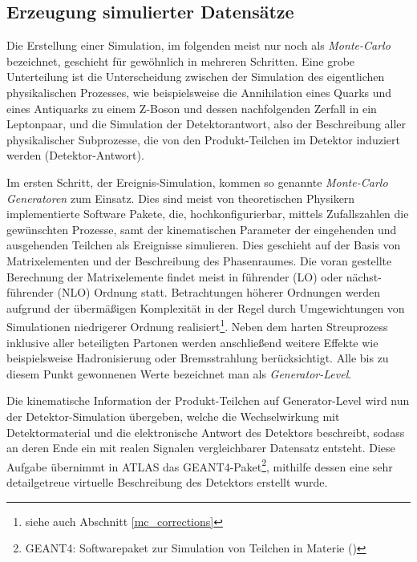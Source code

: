 \subsection{Erzeugung simulierter Datensätze}
\label{event_generation}
Die Erstellung einer Simulation, im folgenden meist nur noch als
\textit{Monte-Carlo} bezeichnet, geschieht für gewöhnlich in mehreren
Schritten. Eine grobe Unterteilung ist die Unterscheidung zwischen der
Simulation des eigentlichen physikalischen Prozesses, wie beispielsweise die
Annihilation eines Quarks und eines Antiquarks zu einem Z-Boson und dessen
nachfolgenden Zerfall in ein Leptonpaar, und die Simulation der
Detektorantwort, also der Beschreibung aller physikalischer Subprozesse, die
von den Produkt-Teilchen im Detektor induziert werden (Detektor-Antwort).

Im ersten Schritt, der Ereignis-Simulation, kommen so genannte
\textit{Monte-Carlo Generatoren} zum Einsatz. Dies sind meist von theoretischen
Physikern implementierte Software Pakete, die, hochkonfigurierbar, mittels
Zufallszahlen die gewünschten Prozesse, samt der kinematischen Parameter der
eingehenden und ausgehenden Teilchen als Ereignisse simulieren. Dies geschieht
auf der Basis von Matrixelementen und der Beschreibung des Phasenraumes. Die
voran gestellte Berechnung der Matrixelemente findet meist in führender (LO)
oder nächst-führender (NLO) Ordnung statt. Betrachtungen höherer Ordnungen
werden aufgrund der übermäßigen Komplexität in der Regel durch Umgewichtungen
von Simulationen niedrigerer Ordnung realisiert\footnote{siehe auch Abschnitt
\ref{mc_corrections}}. Neben dem harten Streuprozess inklusive aller
beteiligten Partonen werden anschließend weitere Effekte wie beispielsweise
Hadronisierung oder Bremsstrahlung berücksichtigt. Alle bis zu diesem Punkt
gewonnenen Werte bezeichnet man als \textit{Generator-Level}.

Die kinematische Information der Produkt-Teilchen auf Generator-Level wird nun
der Detektor-Simulation übergeben, welche die Wechselwirkung mit
Detektormaterial und die elektronische Antwort des Detektors beschreibt, sodass
an deren Ende ein mit realen Signalen vergleichbarer Datensatz entsteht. Diese
Aufgabe übernimmt in ATLAS das \textsc{GEANT4}-Paket\footnote{\textsc{GEANT4}:
Softwarepaket zur Simulation von Teilchen in Materie
(\cite{Agostinelli:2002hh})}, mithilfe dessen eine sehr detailgetreue virtuelle
Beschreibung des Detektors erstellt wurde.



